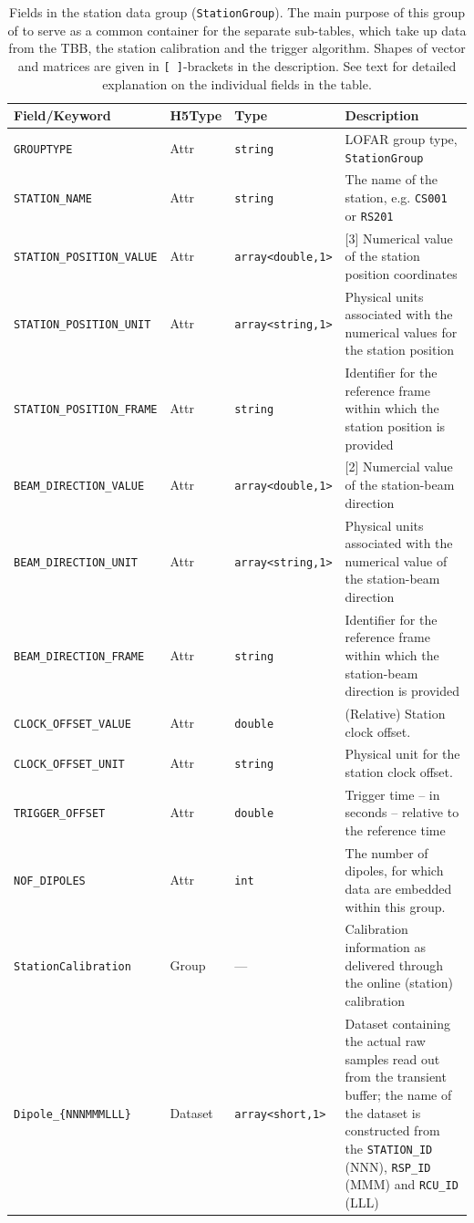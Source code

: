 \documentclass[a4paper,10pt,bibtotoc]{scrartcl}
\begin{document}
\begin{table}[htbp]
  \centering
  \begin{tabular}{|lllp{6cm}|}
    \hline
    \sc Field/Keyword & \sc H5Type & \sc Type & Description \\
    \hline \hline
    \verb|GROUPTYPE| & Attr & \verb|string| & LOFAR group type,
    \texttt{StationGroup} \\
    \verb|STATION_NAME| & Attr & \verb|string| & The name of the
    station, e.g. \texttt{CS001} or \texttt{RS201} \\
    \verb|STATION_POSITION_VALUE| & Attr & \verb|array<double,1>| & [3] Numerical
    value of the station position coordinates \\
    \verb|STATION_POSITION_UNIT|  & Attr & \verb|array<string,1>| & Physical units
    associated with the numerical values for the station position \\
    \verb|STATION_POSITION_FRAME| & Attr & \verb|string| & Identifier for the
    reference frame within which the station position is provided \\
    \verb|BEAM_DIRECTION_VALUE| & Attr & \verb|array<double,1>| & [2] Numercial
    value of the station-beam direction \\
    \verb|BEAM_DIRECTION_UNIT|  & Attr & \verb|array<string,1>| & Physical units
    associated with the numerical value of the station-beam direction \\
    \verb|BEAM_DIRECTION_FRAME| & Attr & \verb|string| & Identifier for the
    reference frame within which the station-beam direction is
    provided \\
    \verb|CLOCK_OFFSET_VALUE| & Attr & \verb|double| & (Relative) Station
    clock offset. \\
    \verb|CLOCK_OFFSET_UNIT| & Attr & \verb|string| & Physical unit
    for the station clock offset. \\
   \verb|TRIGGER_OFFSET| & Attr & \verb|double| & Trigger time -- in seconds --
    relative to the reference time \\
   \verb|NOF_DIPOLES| & Attr & \verb|int| & The number of dipoles, for which
    data are embedded within this group. \\
   \verb|StationCalibration| & Group & --- & Calibration information as delivered
    through the online (station) calibration \\
    \verb|Dipole_{NNNMMMLLL}| & Dataset & \verb|array<short,1>| & Dataset
    containing the actual raw samples read out from the transient
    buffer; the name of the dataset is constructed from the
    \verb|STATION_ID| (NNN), \verb|RSP_ID| (MMM) and \verb|RCU_ID| (LLL) \\
    \hline
  \end{tabular}
  \caption{Fields in the station data group (\texttt{StationGroup}). The
    main purpose of this group of to serve as a common container for the separate
    sub-tables, which take up data from the TBB, the station calibration and
    the trigger algorithm. Shapes of vector and matrices are given in
    \texttt{[ ]}-brackets in the description. See text for detailed explanation
    on the individual fields in the table.}
  \label{tab:STATION_GROUP}
\end{table}
\end{document}
